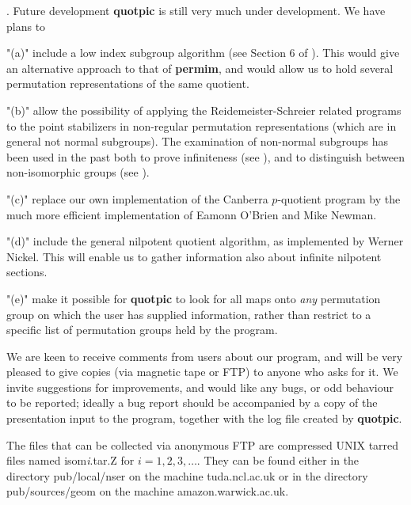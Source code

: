 . Future development                %
\endhead                             %
{\bf quotpic} is still very much under development.
We have plans to
\roster
\item"(a)" include a low index subgroup algorithm (see Section 6 of \cite{9}).
This would give an alternative approach to that of {\bf permim}, and would 
allow us to hold several permutation representations of the same quotient. 
\item"(b)" allow the possibility of applying the Reidemeister-Schreier related
programs to the point stabilizers in non-regular permutation representations
(which are in general not normal subgroups). The examination of non-normal
subgroups has been used in the past both to prove infiniteness (see \cite{6}), 
and to distinguish between non-isomorphic groups (see \cite{2}). 
\item"(c)" replace our own implementation of the Canberra $p$-quotient program
by the much more efficient implementation of Eamonn O'Brien and Mike
Newman. 
\item"(d)" include the general nilpotent quotient algorithm, as implemented by
Werner Nickel. This will enable us to gather information also about infinite
nilpotent sections.
\item"(e)" make it possible for {\bf quotpic} to look for all maps onto 
{\it any} permutation group on which the user has supplied information,
rather than restrict to a specific list of permutation groups held by the 
program.  
\endroster

We are keen to receive comments from users about our program, and will 
be very pleased to give copies (via magnetic tape or FTP)
to anyone who asks for it.
We invite suggestions for improvements, and would like any bugs, or
odd behaviour to be reported; ideally a bug report should be accompanied by a
copy of the presentation input to the program, together with the log file
created by {\bf quotpic}.

The files that can be collected via anonymous FTP are compressed UNIX tarred
files named isom{\it i}.tar.Z for $i = 1,2,3, \ldots $. They can be found
either in the directory pub/local/nser on the machine tuda.ncl.ac.uk or in the
directory pub/sources/geom on the machine amazon.warwick.ac.uk.

\Refs

